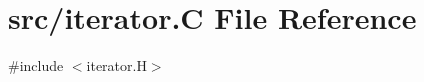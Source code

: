 \hypertarget{iterator_8_c}{}\section{src/iterator.C File Reference}
\label{iterator_8_c}
{\ttfamily \#include $<$iterator.\+H$>$}\newline
